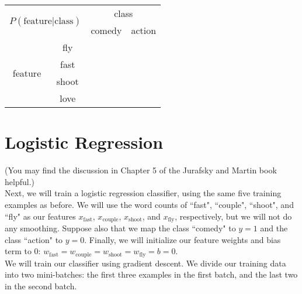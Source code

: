 \documentclass[11pt,letterpaper]{article}
\begin{document}
\begin{center}
\begin{tabular}{|c|c|c|c|}
\hline 
\multicolumn{2}{|c|}{\multirow{2}{*}{$P(\mathrm{feature|class})$}} & \multicolumn{2}{|c|}{class} \\ 
\cline{3-4}
\multicolumn{2}{|c|}{} & comedy & action \\ 
\hline 
\multirow{4}{*}{feature} & fly &  &  \\ 
\cline{2-4}
& fast &  &  \\ 
\cline{2-4}
& shoot &  &  \\ 
\cline{2-4}
& love &  &  \\ 
\hline
\end{tabular} 
\end{center}

\section{Logistic Regression}

(You may find the discussion in Chapter 5 of the Jurafsky and Martin book helpful.)\\

\noindent Next, we will train a logistic regression classifier, using the same five training examples as before. We will use the word counts of ``fast", ``couple", ``shoot", and ``fly" as our features $x_\mathrm{fast}$, $x_\mathrm{couple}$, $x_\mathrm{shoot}$, and $x_\mathrm{fly}$, respectively, but we will not do any smoothing. Suppose also that we map the class ``comedy" to $y=1$ and the class ``action" to $y=0$. Finally, we will initialize our feature weights and bias term to 0: $w_\mathrm{fast}=w_\mathrm{couple}=w_\mathrm{shoot}=w_\mathrm{fly}=b=0$.\\

\noindent We will train our classifier using gradient descent. We divide our training data into two mini-batches: the first three examples in the first batch, and the last two in the second batch.
\end{document}
